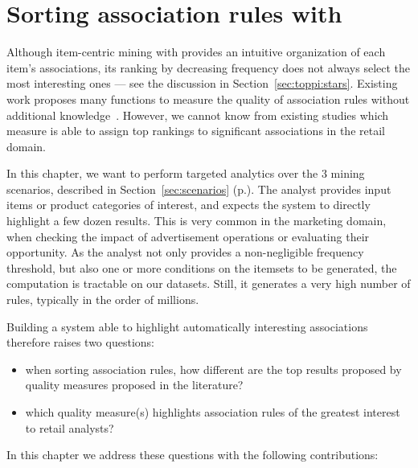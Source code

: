 \chapter{Sorting association rules with \capa}
\label{chap:capa}


\minitoc


Although item-centric mining with \toppi provides an intuitive organization of each item's associations,
its ranking by decreasing frequency does not always select the most interesting ones ---
see the discussion in Section~\ref{sec:toppi:stars}.
Existing work proposes many functions to %
measure the quality of association rules without additional knowledge~\cite{GengACM06,Lenca2007}.
However, we cannot know from existing studies which measure is able to
assign top rankings to significant associations in the retail domain.

In this chapter, we want to perform targeted analytics over the 3 \datalyse mining scenarios,
described in Section~\ref{sec:scenarios} (p.\pageref{sec:scenarios}).
The analyst provides input items or product categories of interest,
and expects the system to directly highlight a few dozen results.
This is very common in the marketing domain,
when checking the impact of advertisement operations or evaluating their opportunity.
As the analyst not only provides a non-negligible frequency threshold,
but also one or more conditions on the itemsets to be generated,
the computation is tractable on our datasets.
Still, it generates a very high number of rules, typically in the order of millions.

Building a system able to highlight automatically interesting associations
therefore raises two questions:

\begin{itemize}
  \item when sorting association rules,
    how different are the top results proposed by quality measures proposed in the literature?

  \item which quality measure(s) highlights association rules of the greatest interest to retail analysts?
\end{itemize}

In this chapter we address these questions with the following contributions:

